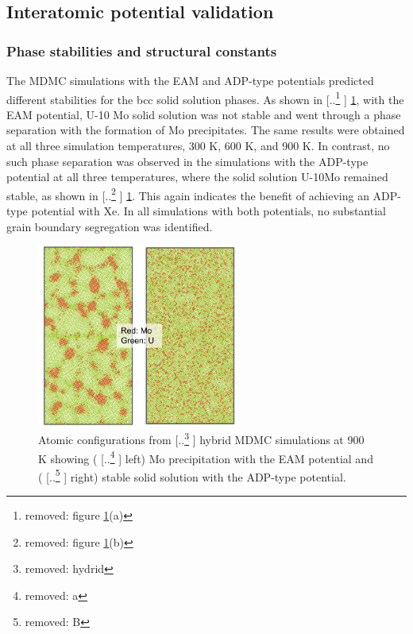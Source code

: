 \documentclass[review]{elsarticle}
\providecommand{\DIFaddtex}[1]{{\protect\color{blue} \sf #1}} %
\providecommand{\DIFdeltex}[1]{{\protect\color{red} [..\footnote{removed: #1} ]}} %
\providecommand{\DIFaddbegin}{} %
\providecommand{\DIFaddend}{} %
\providecommand{\DIFdelbegin}{} %
\providecommand{\DIFdelend}{} %
\providecommand{\DIFaddFL}[1]{\DIFadd{#1}} %
\providecommand{\DIFdelFL}[1]{\DIFdel{#1}} %
\providecommand{\DIFaddbeginFL}{} %
\providecommand{\DIFaddendFL}{} %
\providecommand{\DIFdelbeginFL}{} %
\providecommand{\DIFdelendFL}{} %
\providecommand{\DIFadd}[1]{\texorpdfstring{\DIFaddtex{#1}}{#1}} %
\providecommand{\DIFdel}[1]{\texorpdfstring{\DIFdeltex{#1}}{}} %
\newcommand{\DIFscaledelfig}{0.5}
\newlength{\DIFdelgraphicswidth} %
\newlength{\DIFdelgraphicsheight} %
\newcommand{\DIFaddincludegraphics}[2][]{{\color{blue}\fbox{\DIFOincludegraphics[#1]{#2}}}} %
\newcommand{\DIFdelincludegraphics}[2][]{%
\sbox{\DIFdelgraphicsbox}{\DIFOincludegraphics[#1]{#2}}%
\settoboxwidth{\DIFdelgraphicswidth}{\DIFdelgraphicsbox} %
\settoboxtotalheight{\DIFdelgraphicsheight}{\DIFdelgraphicsbox} %
\scalebox{\DIFscaledelfig}{%
\parbox[b]{\DIFdelgraphicswidth}{\usebox{\DIFdelgraphicsbox}\\[-\baselineskip] \rule{\DIFdelgraphicswidth}{0em}}\llap{\resizebox{\DIFdelgraphicswidth}{\DIFdelgraphicsheight}{%
\setlength{\unitlength}{\DIFdelgraphicswidth}%
\begin{picture}(1,1)%
\thicklines\linethickness{2pt} %
{\color[rgb]{1,0,0}\put(0,0){\framebox(1,1){}}}%
{\color[rgb]{1,0,0}\put(0,0){\line( 1,1){1}}}%
{\color[rgb]{1,0,0}\put(0,1){\line(1,-1){1}}}%
\end{picture}%
}\hspace*{3pt}}} %
} %
\DeclareRobustCommand{\DIFaddbegin}{\DIFOaddbegin \let\includegraphics\DIFaddincludegraphics} %
\DeclareRobustCommand{\DIFaddend}{\DIFOaddend \let\includegraphics\DIFOincludegraphics} %
\DeclareRobustCommand{\DIFdelbegin}{\DIFOdelbegin \let\includegraphics\DIFdelincludegraphics} %
\DeclareRobustCommand{\DIFdelend}{\DIFOaddend \let\includegraphics\DIFOincludegraphics} %
\DeclareRobustCommand{\DIFaddbeginFL}{\DIFOaddbeginFL \let\includegraphics\DIFaddincludegraphics} %
\DeclareRobustCommand{\DIFaddendFL}{\DIFOaddendFL \let\includegraphics\DIFOincludegraphics} %
\DeclareRobustCommand{\DIFdelbeginFL}{\DIFOdelbeginFL \let\includegraphics\DIFdelincludegraphics} %
\DeclareRobustCommand{\DIFdelendFL}{\DIFOaddendFL \let\includegraphics\DIFOincludegraphics} %
\begin{document}
\subsection{Interatomic potential validation}

\subsubsection{Phase stabilities and structural constants}
\DIFaddbegin 

\DIFaddend The MDMC simulations with the EAM and ADP-type potentials predicted different stabilities for the bcc solid solution phases. As shown in \DIFdelbegin \DIFdel{figure \ref{fig:Mo_precip}(a)}\DIFdelend \DIFaddbegin \DIFadd{\cref{fig:Mo_precip}}\DIFaddend , with the EAM potential, U-10 Mo solid solution was not stable and went through a phase separation with the formation of Mo precipitates. The same results were obtained at all three simulation temperatures, 300 K, 600 K, and 900 K. In contrast, no such phase separation was observed in the simulations with the ADP-type potential at all three temperatures, where the solid solution U-10Mo remained stable, as shown in \DIFdelbegin \DIFdel{figure \ref{fig:Mo_precip}(b)}\DIFdelend \DIFaddbegin \DIFadd{\cref{fig:Mo_precip}}\DIFaddend . This again indicates the benefit of achieving an ADP-type potential with Xe. In all simulations with both potentials, no substantial grain boundary segregation was identified. 

\begin{figure}[h!]
 \centering
 \DIFdelbeginFL %
\DIFdelendFL \DIFaddbeginFL \includegraphics[width=0.6\textwidth]{Mo_precipitation} 
 \DIFaddendFL \caption{Atomic configurations from \DIFdelbeginFL \DIFdelFL{hydrid }\DIFdelendFL \DIFaddbeginFL \DIFaddFL{hybrid }\DIFaddendFL MDMC simulations at 900 K showing (\DIFdelbeginFL \DIFdelFL{a}\DIFdelendFL \DIFaddbeginFL \DIFaddFL{left}\DIFaddendFL ) Mo precipitation with the EAM potential and (\DIFdelbeginFL \DIFdelFL{B}\DIFdelendFL \DIFaddbeginFL \DIFaddFL{right}\DIFaddendFL ) stable solid solution with the ADP-type potential. }
 \label{fig:Mo_precip}
\end{figure}
\end{document}
